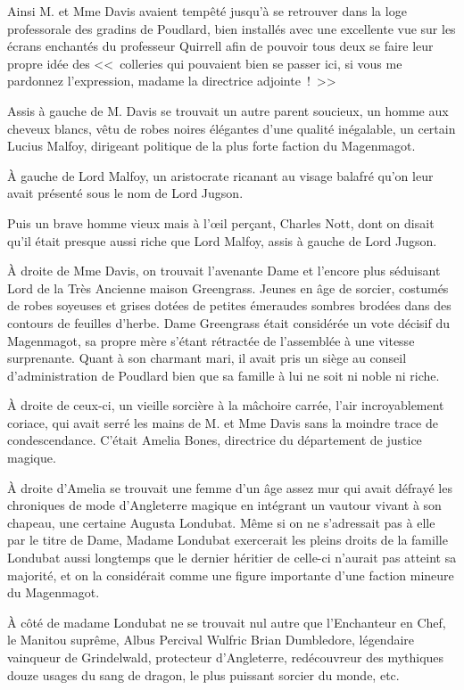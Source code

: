 Ainsi M. et Mme Davis avaient tempêté jusqu'à se retrouver dans la loge professorale des gradins de Poudlard, bien installés avec une excellente vue sur les écrans enchantés du professeur Quirrell afin de pouvoir tous deux se faire leur propre idée des <<~colleries qui pouvaient bien se passer ici, si vous me pardonnez l'expression, madame la directrice adjointe~!~>>

Assis à gauche de M. Davis se trouvait un autre parent soucieux, un homme aux cheveux blancs, vêtu de robes noires élégantes d'une qualité inégalable, un certain Lucius Malfoy, dirigeant politique de la plus forte faction du Magenmagot.

À gauche de Lord Malfoy, un aristocrate ricanant au visage balafré qu'on leur avait présenté sous le nom de Lord Jugson.

Puis un brave homme vieux mais à l'œil perçant, Charles Nott, dont on disait qu'il était presque aussi riche que Lord Malfoy, assis à gauche de Lord Jugson.

À droite de Mme Davis, on trouvait l'avenante Dame et l'encore plus séduisant Lord de la Très Ancienne maison Greengrass. Jeunes en âge de sorcier, costumés de robes soyeuses et grises dotées de petites émeraudes sombres brodées dans des contours de feuilles d'herbe. Dame Greengrass était considérée un vote décisif du Magenmagot, sa propre mère s'étant rétractée de l'assemblée à une vitesse surprenante. Quant à son charmant mari, il avait pris un siège au conseil d'administration de Poudlard bien que sa famille à lui ne soit ni noble ni riche.

À droite de ceux-ci, un vieille sorcière à la mâchoire carrée, l'air incroyablement coriace, qui avait serré les mains de M. et Mme Davis sans la moindre trace de condescendance. C'était Amelia Bones, directrice du département de justice magique.

À droite d'Amelia se trouvait une femme d'un âge assez mur qui avait défrayé les chroniques de mode d'Angleterre magique en intégrant un vautour vivant à son chapeau, une certaine Augusta Londubat. Même si on ne s'adressait pas à elle par le titre de Dame, Madame Londubat exercerait les pleins droits de la famille Londubat aussi longtemps que le dernier héritier de celle-ci n'aurait pas atteint sa majorité, et on la considérait comme une figure importante d'une faction mineure du Magenmagot.

À côté de madame Londubat ne se trouvait nul autre que l'Enchanteur en Chef, le Manitou suprême, Albus Percival Wulfric Brian Dumbledore, légendaire vainqueur de Grindelwald, protecteur d'Angleterre, redécouvreur des mythiques douze usages du sang de dragon, le plus puissant sorcier du monde, etc.

